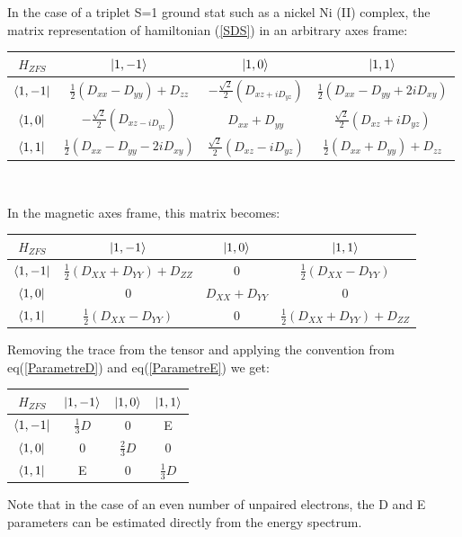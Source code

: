 \documentclass[12pt]{report}
\numberwithin{equation}{section}
\begin{document}
In the case of a triplet S=1 ground stat such as a nickel Ni (II) complex, the matrix representation of hamiltonian (\ref{SDS}) in an arbitrary axes frame:
\begin{center}
    \begin{tabular}{ c | c c c}
        $H_{ZFS}$ & $\ket{1,-1}$ & $\ket{1,0} $& $\ket{1,1}$ \\
        \hline
        $\bra{1,-1} $&  $\frac{1}{2}(D_{xx}-D_{yy})+D_{zz}$ & $-\frac{\sqrt{2}}{2}(D_{xz+iD_{yz}}) $ & $\frac{1}{2}(D_{xx}-D_{yy}+2iD_{xy})$ \\
        $\bra{1,0}$ & $-\frac{\sqrt{2}}{2}(D_{xz-iD_{yz}})  $& $ D_{xx}+D_{yy}  $&$ \frac{\sqrt{2}}{2}(D_{xz}+iD_{yz})$ \\
        $\bra{1,1} $& $ \frac{1}{2}(D_{xx}-D_{yy}-2iD_{xy}) $& $\frac{\sqrt{2}}{2}(D_{xz}-iD_{yz})$  & $\frac{1}{2}(D_{xx}+D_{yy})+D_{zz} $ \\
    \end{tabular}\\
\end{center}
In the magnetic axes frame, this matrix becomes:
\begin{center}
\begin{tabular}{c | c c c}
    $H_{ZFS}$ & $\ket{1,-1}$ & $\ket{1,0} $& $\ket{1,1}$ \\
    \hline
    $\bra{1,-1}$ & $\frac{1}{2}(D_{XX}+D_{YY})+D_{ZZ}$ & 0 & $\frac{1}{2}(D_{XX}-D_{YY})$\\
    $\bra{1,0}$ & 0 & $D_{XX}+D_{YY}$ & 0\\
    $\bra{1,1}$ &  $\frac{1}{2}(D_{XX}-D_{YY})$ & 0 & $\frac{1}{2}(D_{XX}+D_{YY})+D_{ZZ}$
\end{tabular}
\end{center}
Removing the trace from the tensor and applying the convention from eq(\ref{ParametreD}) and eq(\ref{ParametreE}) we get:
\begin{center}
\begin{tabular}{c | c c c}
    $H_{ZFS}$ & $\ket{1,-1}$ & $\ket{1,0}$ & $\ket{1,1}$\\
    \hline
    $\bra{1,-1}$ & $\frac{1}{3}D$ & 0 & E\\
    $\bra{1,0}$ & 0 & $\frac{2}{3}D $& 0\\
    $\bra{1,1}$ & E & 0 & $\frac{1}{3}D$
\end{tabular}
\end{center}
Note that in the case of an even number of unpaired electrons, the D and E parameters can be estimated directly from the energy spectrum.
\end{document}
